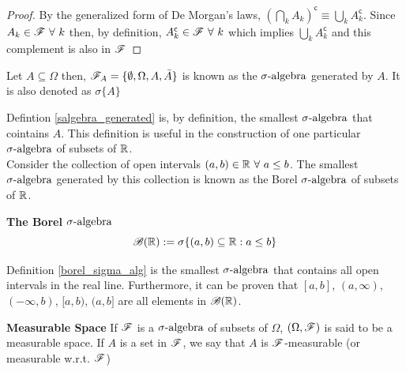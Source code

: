 \documentclass[../TGMAFFIRO.tex]{subfiles}
\begin{document}
\begin{proof}
	By the generalized form of De Morgan's laws, $(\bigcap_k A_k)^\mathsf{c} \equiv \bigcup_k A_k^\mathsf{c}$. Since $A_k \in \mathscr{F} \ \forall \ k$ then, by definition,  $A_k^\mathsf{c} \in \mathscr{F} \ \forall \ k$ which implies  $\bigcup_k A_k^\mathsf{c}$ and this complement is also in $\mathscr{F}$
\end{proof}

\begin{definition}\label{salgebra_generated}
	Let $A \subseteq \Omega$ then, $\mathscr{F}_A = \{\emptyset, \Omega, A, \bar{A}\}$ is known as the $\sigma\text{-algebra}$ generated by $A$. It is also denoted as $\sigma\{A\}$
\end{definition}

Defintion \ref{salgebra_generated} is, by definition, the smallest $\sigma\text{-algebra}$ that cointains $A$. This definition is useful in the construction of one particular $\sigma\text{-algebra}$ of subsets of $\mathbb{R}$.\\

Consider the collection of open intervals $(a,b) \in \mathbb{R} \ \forall \ a \leq b$. The smallest $\sigma\text{-algebra}$ generated by this collection is known as the Borel $\sigma\text{-algebra}$ of subsets of $\mathbb{R}$.

\begin{definition}{\textbf{The Borel $\sigma\text{-algebra}$}}\label{borel_sigma_alg}
		\begin{equation}
			\mathscr{B}(\mathbb{R}) := \sigma\{(a,b) \subseteq \mathbb{R}:a\leq b\}
		\end{equation}
\end{definition}

Definition \ref{borel_sigma_alg} is the smallest $\sigma\text{-algebra}$ that contains all open intervals in the real line. Furthermore, it can be proven that $[a, b]$, $(a,\infty)$, $(-\infty, b)$, $[a, b)$, $(a, b]$ are all elements in $\mathscr{B}(\mathbb{R})$. 

\begin{definition}{\textbf{Measurable Space}}
	If $\mathscr{F}$ is a $\sigma\text{-algebra}$ of subsets of $\Omega$, $(\Omega, \mathscr{F})$ is said to be a measurable space. If $A$ is a set in $\mathscr{F}$, we say that $A$ is $\mathscr{F}$-measurable (or measurable w.r.t. $\mathscr{F}$)
\end{definition}
\end{document}
